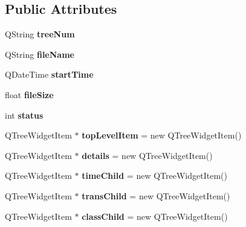 \subsection*{Public Attributes}
\begin{DoxyCompactItemize}
\item 
Q\+String {\bfseries tree\+Num}\hypertarget{class_item_ab51701536fec3a1a7ae5e9a71b0a5bd8}{}\label{class_item_ab51701536fec3a1a7ae5e9a71b0a5bd8}

\item 
Q\+String {\bfseries file\+Name}\hypertarget{class_item_a18d1b125537b31e3d1fa387437f5f499}{}\label{class_item_a18d1b125537b31e3d1fa387437f5f499}

\item 
Q\+Date\+Time {\bfseries start\+Time}\hypertarget{class_item_a8b9b94514b13ac3f16c4aea0e185abe6}{}\label{class_item_a8b9b94514b13ac3f16c4aea0e185abe6}

\item 
float {\bfseries file\+Size}\hypertarget{class_item_a7af91f5e63a1b6ca2218ea0872809f73}{}\label{class_item_a7af91f5e63a1b6ca2218ea0872809f73}

\item 
int {\bfseries status}\hypertarget{class_item_a7525a60123ccfc3b8cbf5ab8c28ab5d5}{}\label{class_item_a7525a60123ccfc3b8cbf5ab8c28ab5d5}

\item 
Q\+Tree\+Widget\+Item $\ast$ {\bfseries top\+Level\+Item} = new Q\+Tree\+Widget\+Item()\hypertarget{class_item_a8ee4a5d86ca268da79efa4b4212829a0}{}\label{class_item_a8ee4a5d86ca268da79efa4b4212829a0}

\item 
Q\+Tree\+Widget\+Item $\ast$ {\bfseries details} = new Q\+Tree\+Widget\+Item()\hypertarget{class_item_a78fc26d1f4c47377ae26205aaebd0d8a}{}\label{class_item_a78fc26d1f4c47377ae26205aaebd0d8a}

\item 
Q\+Tree\+Widget\+Item $\ast$ {\bfseries time\+Child} = new Q\+Tree\+Widget\+Item()\hypertarget{class_item_abba8145cd950fac8341e7fa763e5fc60}{}\label{class_item_abba8145cd950fac8341e7fa763e5fc60}

\item 
Q\+Tree\+Widget\+Item $\ast$ {\bfseries trans\+Child} = new Q\+Tree\+Widget\+Item()\hypertarget{class_item_a34e563c60fd0930e94e900379e4d4864}{}\label{class_item_a34e563c60fd0930e94e900379e4d4864}

\item 
Q\+Tree\+Widget\+Item $\ast$ {\bfseries class\+Child} = new Q\+Tree\+Widget\+Item()\hypertarget{class_item_afea5c006531a31493c0564301cce1b77}{}\label{class_item_afea5c006531a31493c0564301cce1b77}


\end{DoxyCompactItemize}
